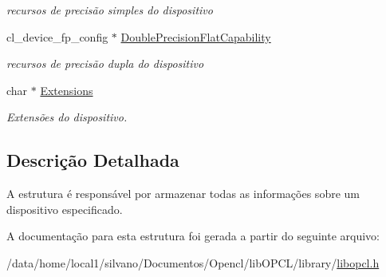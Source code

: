 \begin{DoxyCompactItemize}
\begin{DoxyCompactList}\small\item\em recursos de precisão simples do dispositivo \end{DoxyCompactList}\item 
\hypertarget{structdevices_a9f9941ab957970afe7995713675e0c16}{}\label{structdevices_a9f9941ab957970afe7995713675e0c16} 
cl\+\_\+device\+\_\+fp\+\_\+config $\ast$ \hyperlink{structdevices_a9f9941ab957970afe7995713675e0c16}{Double\+Precision\+Flat\+Capability}
\begin{DoxyCompactList}\small\item\em recursos de precisão dupla do dispositivo \end{DoxyCompactList}\item 
\hypertarget{structdevices_a04797e250a09482a400749add9f8862e}{}\label{structdevices_a04797e250a09482a400749add9f8862e} 
char $\ast$ \hyperlink{structdevices_a04797e250a09482a400749add9f8862e}{Extensions}
\begin{DoxyCompactList}\small\item\em Extensões do dispositivo. \end{DoxyCompactList}\end{DoxyCompactItemize}


\subsection{Descrição Detalhada}
A estrutura é responsável por armazenar todas as informações sobre um dispositivo especificado. 

A documentação para esta estrutura foi gerada a partir do seguinte arquivo\+:\begin{DoxyCompactItemize}
\item 
/data/home/local1/silvano/\+Documentos/\+Opencl/lib\+O\+P\+C\+L/library/\hyperlink{libopcl_8h}{libopcl.\+h}\end{DoxyCompactItemize}
